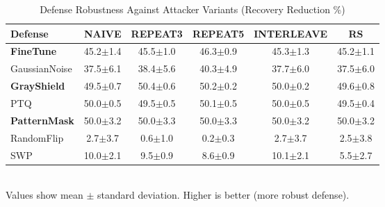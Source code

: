 \begin{table}[t]
\centering
\caption{Defense Robustness Against Attacker Variants (Recovery Reduction \%)}
\label{tab:attacker_robustness}
\begin{tabular}{lccccc}
\toprule
\textbf{Defense} & \textbf{NAIVE} & \textbf{REPEAT3} & \textbf{REPEAT5} & \textbf{INTERLEAVE} & \textbf{RS} \\
\midrule
\textbf{FineTune} & 45.2$\pm$1.4 & 45.5$\pm$1.0 & 46.3$\pm$0.9 & 45.3$\pm$1.3 & 45.2$\pm$1.1 \\
GaussianNoise & 37.5$\pm$6.1 & 38.4$\pm$5.6 & 40.3$\pm$4.9 & 37.7$\pm$6.0 & 37.5$\pm$6.0 \\
\textbf{GrayShield} & 49.5$\pm$0.7 & 50.4$\pm$0.6 & 50.2$\pm$0.2 & 50.0$\pm$0.2 & 49.6$\pm$0.8 \\
PTQ & 50.0$\pm$0.5 & 49.5$\pm$0.5 & 50.1$\pm$0.5 & 50.0$\pm$0.5 & 49.5$\pm$0.4 \\
\textbf{PatternMask} & 50.0$\pm$3.2 & 50.0$\pm$3.3 & 50.0$\pm$3.3 & 50.0$\pm$3.2 & 50.0$\pm$3.2 \\
RandomFlip & 2.7$\pm$3.7 & 0.6$\pm$1.0 & 0.2$\pm$0.3 & 2.7$\pm$3.7 & 2.5$\pm$3.8 \\
SWP & 10.0$\pm$2.1 & 9.5$\pm$0.9 & 8.6$\pm$0.9 & 10.1$\pm$2.1 & 5.5$\pm$2.7 \\
\bottomrule
\end{tabular}
\vspace{0.1cm}
\\
\footnotesize{Values show mean $\pm$ standard deviation. Higher is better (more robust defense).}
\end{table}
